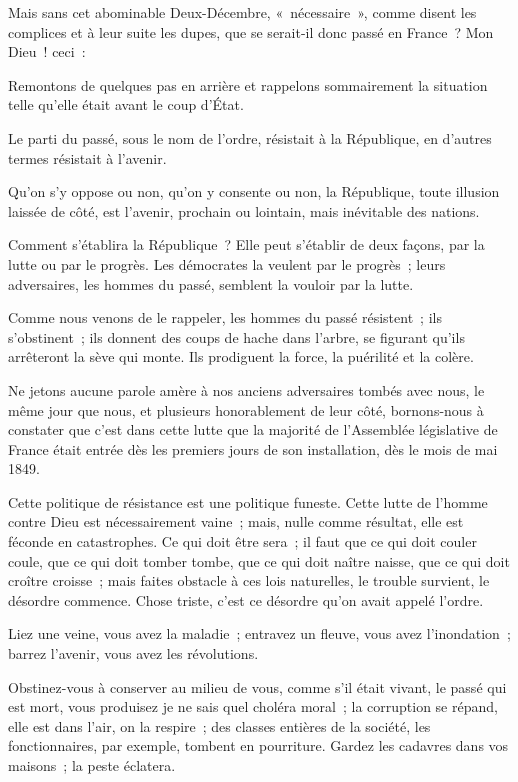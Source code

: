 \documentclass[french,twoside]{book} %
\begin{document}
\noindent Mais sans cet abominable Deux-Décembre, « nécessaire », comme disent les complices et à leur suite les dupes, que se serait-il donc passé en France ? Mon Dieu ! ceci :\par
Remontons de quelques pas en arrière et rappelons sommairement la situation telle qu’elle était avant le coup d’État.\par
Le parti du passé, sous le nom de l’ordre, résistait à la République, en d’autres termes résistait à l’avenir.\par
Qu’on s’y oppose ou non, qu’on y consente ou non, la République, toute illusion laissée de côté, est l’avenir, prochain ou lointain, mais inévitable des nations.\par
Comment s’établira la République ? Elle peut s’établir de deux façons, par la lutte ou par le progrès. Les démocrates la veulent par le progrès ; leurs adversaires, les hommes du passé, semblent la vouloir par la lutte.\par
Comme nous venons de le rappeler, les hommes du passé résistent ; ils s’obstinent ; ils donnent des coups de hache dans l’arbre, se figurant qu’ils arrêteront la sève qui monte. Ils prodiguent la force, la puérilité et la colère.\par
Ne jetons aucune parole amère à nos anciens adversaires tombés avec nous, le même jour que nous, et plusieurs honorablement de leur côté, bornons-nous à constater que c’est dans cette lutte que la majorité de l’Assemblée législative de France était entrée dès les premiers jours de son installation, dès le mois de mai 1849.\par
Cette politique de résistance est une politique funeste. Cette lutte de l’homme contre Dieu est nécessairement vaine ; mais, nulle comme résultat, elle est féconde en catastrophes. Ce qui doit être sera ; il faut que ce qui doit couler coule, que ce qui doit tomber tombe, que ce qui doit naître naisse, que ce qui doit croître croisse ; mais faites obstacle à ces lois naturelles, le trouble survient, le désordre commence. Chose triste, c’est ce désordre qu’on avait appelé l’ordre.\par
Liez une veine, vous avez la maladie ; entravez un fleuve, vous avez l’inondation ; barrez l’avenir, vous avez les révolutions.\par
Obstinez-vous à conserver au milieu de vous, comme s’il était vivant, le passé qui est mort, vous produisez je ne sais quel choléra moral ; la corruption se répand, elle est dans l’air, on la respire ; des classes entières de la société, les fonctionnaires, par exemple, tombent en pourriture. Gardez les cadavres dans vos maisons ; la peste éclatera.\par
\end{document}
